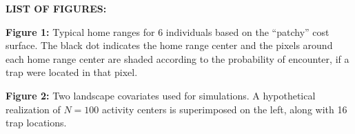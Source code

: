 \documentclass[12pt]{article}
\begin{document}

\newpage

{\flushleft \bf LIST OF FIGURES:}

\vspace{.2in}


{\flushleft \bf 
Figure 1:} 
Typical home ranges for 6 individuals based on the ``patchy'' cost surface.
The black dot indicates the home
  range center and the pixels around each home range center are shaded
according to the probability of encounter, if a trap were located in
that pixel.



\vspace{.2in}


{\flushleft \bf Figure 2:}
Two landscape covariates used for simulations. A hypothetical
  realization of $N=100$ activity centers is superimposed on the left,
along with 16 trap locations. 


\newpage


\end{document}
